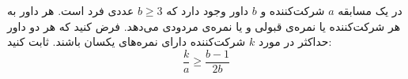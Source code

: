 \EXERCISE
در یک مسابقه
$a$
شرکت‌کننده و
$b$
داور وجود دارد که
$b \geq 3$
عددی فرد است. هر داور به هر شرکت‌کننده یا نمره‌ی قبولی و یا نمره‌ی مردودی می‌دهد. فرض کنید که هر دو داور حداکثر در مورد
$k$
شرکت‌کننده دارای نمره‌های یکسان باشند. ثابت کنید:
$$\frac{k}{a} \geq \frac{b - 1}{2b}$$